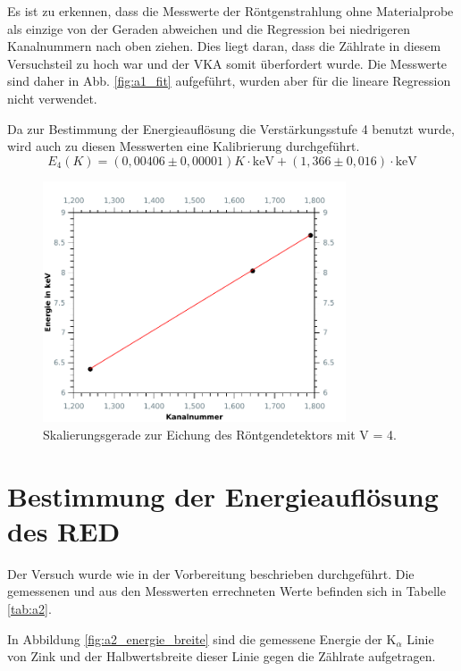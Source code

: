 Es ist zu erkennen, dass die Messwerte der Röntgenstrahlung ohne Materialprobe als einzige von der Geraden abweichen und die Regression bei niedrigeren Kanalnummern nach oben ziehen. Dies liegt daran, dass die Zählrate in diesem Versuchsteil zu hoch war und der VKA somit überfordert wurde. Die Messwerte sind daher in Abb. \ref{fig:a1_fit} aufgeführt, wurden aber für die lineare Regression nicht verwendet.

Da zur Bestimmung der Energieauflösung die Verstärkungsstufe 4 benutzt wurde, wird auch zu diesen Messwerten eine Kalibrierung durchgeführt.
\begin{equation}
	E_4(K) = (0,00406\pm 0,00001)K\cdot\si{\kilo\electronvolt} + (1,366\pm 0,016)\cdot\si{\kilo\electronvolt}
\end{equation} 

\begin{figure}[h]
	\centering\includegraphics[width=0.8\textwidth]{fig/a1_fit_4}
	\caption{Skalierungsgerade zur Eichung des Röntgendetektors mit V = 4.}
	\label{fig:a1_fit_4}
\end{figure}

\section{Bestimmung der Energieauflösung des RED}
Der Versuch wurde wie in der Vorbereitung beschrieben durchgeführt.
Die gemessenen und aus den Messwerten errechneten Werte befinden sich in Tabelle \ref{tab:a2}.\\


In Abbildung \ref{fig:a2_energie_breite} sind die gemessene Energie der K$_\alpha$ Linie von Zink und der Halbwertsbreite dieser Linie gegen die Zählrate aufgetragen.

